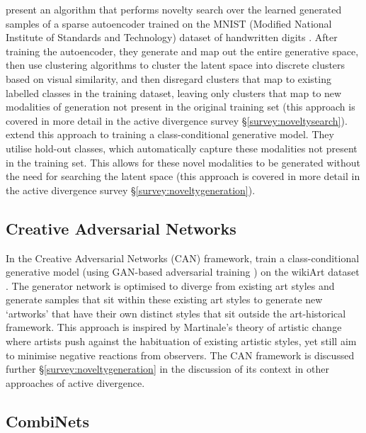 \citet{kazakcci2016digits} present an algorithm that performs novelty search over the learned generated samples of a sparse autoencoder trained on the MNIST (Modified National Institute of Standards and Technology) dataset of handwritten digits \citep{lecun1998gradient}.
After training the autoencoder, they generate and map out the entire generative space, then use clustering algorithms to cluster the latent space into discrete clusters based on visual similarity, and then disregard clusters that map to existing labelled classes in the training dataset, leaving only clusters that map to new modalities of generation not present in the original training set (this approach is covered in more detail in the active divergence survey \S \ref{survey:noveltysearch}). 
\citep{cherti2017out} extend this approach to training a class-conditional generative model. 
They utilise hold-out classes, which automatically capture these modalities not present in the training set. 
This allows for these novel modalities to be generated without the need for searching the latent space (this approach is covered in more detail in the active divergence survey \S \ref{survey:noveltygeneration}).

\subsection{Creative Adversarial Networks}

In the Creative Adversarial Networks (CAN) framework, \cite{elgammal2017can} train a class-conditional generative model (using GAN-based adversarial training \citep{goodfellow2014generative}) on the wikiArt dataset \citep{saleh2016large}. 
The generator network is optimised to diverge from existing art styles and generate samples that sit within these existing art styles to generate new `artworks' that have their own distinct styles that sit outside the art-historical framework.
This approach is inspired by Martinale's theory of artistic change \citep{martindale1990clockwork} where artists push against the habituation of existing artistic styles, yet still aim to minimise negative reactions from observers. 
The CAN framework is discussed further \S \ref{survey:noveltygeneration} in the discussion of its context in other approaches of active divergence. 

\subsection{CombiNets}

